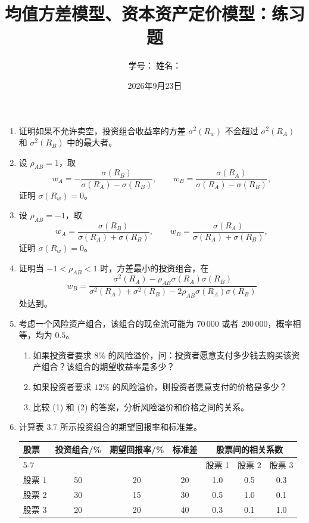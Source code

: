 \documentclass{article}
\author{学号：\underline{\hspace{4cm}} 姓名：\underline{\hspace{4cm}} }
\title{均值方差模型、资本资产定价模型：练习题}
\date{2026年9月23日}
\begin{document}
\maketitle

\begin{enumerate}[label=\textbf{\arabic*.}]

\item 证明如果不允许卖空，投资组合收益率的方差 \(\sigma^2(R_w)\) 不会超过 \(\sigma^2(R_A)\) 和 \(\sigma^2(R_B)\) 中的最大者。

\item 设 \(\rho_{AB}=1\)，取
\[
w_A=-\frac{\sigma(R_B)}{\sigma(R_A)-\sigma(R_B)},\qquad
w_B=\frac{\sigma(R_A)}{\sigma(R_A)-\sigma(R_B)},
\]
证明 \(\sigma(R_w)=0\)。

\item 设 \(\rho_{AB}=-1\)，取
\[
w_A=\frac{\sigma(R_B)}{\sigma(R_A)+\sigma(R_B)},\qquad
w_B=\frac{\sigma(R_A)}{\sigma(R_A)+\sigma(R_B)},
\]
证明 \(\sigma(R_w)=0\)。

\item 证明当 \(-1<\rho_{AB}<1\) 时，方差最小的投资组合，在
\[
w_B=\frac{\sigma^2(R_A)-\rho_{AB}\sigma(R_A)\sigma(R_B)}
{\sigma^2(R_A)+\sigma^2(R_B)-2\rho_{AB}\sigma(R_A)\sigma(R_B)}
\]
处达到。

\item 考虑一个风险资产组合，该组合的现金流可能为 \(70\,000\) 或者 \(200\,000\)，概率相等，均为 \(0.5\)。
\begin{enumerate}[label=(\arabic*), leftmargin=*]
    \item 如果投资者要求 \(8\%\) 的风险溢价，问：投资者愿意支付多少钱去购买该资产组合？该组合的期望收益率是多少？
    \item 如果投资者要求 \(12\%\) 的风险溢价，则投资者愿意支付的价格是多少？
    \item 比较 (1) 和 (2) 的答案，分析风险溢价和价格之间的关系。
\end{enumerate}

\item 计算表 3.7 所示投资组合的期望回报率和标准差。


\begin{center}
\begin{tabular}{lcccccc}
\toprule
股票 & 投资组合/\% & 期望回报率/\% & 标准差 & \multicolumn{3}{c}{股票间的相关系数} \\
\cmidrule(lr){5-7}
& & & & 股票 1 & 股票 2 & 股票 3 \\
\midrule
股票 1 & 50 & 20 & 20 & 1.0 & 0.5 & 0.3 \\
股票 2 & 30 & 15 & 30 & 0.5 & 1.0 & 0.1 \\
股票 3 & 20 & 20 & 40 & 0.3 & 0.1 & 1.0 \\
\bottomrule
\end{tabular}
\end{center}


\end{enumerate}
\end{document}
